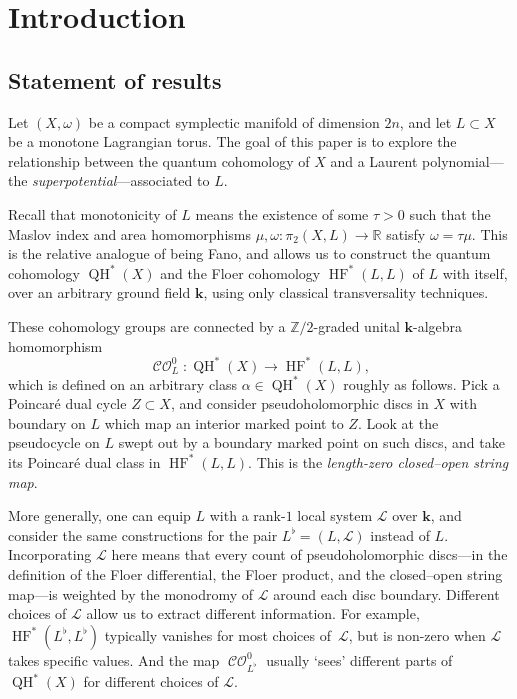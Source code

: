 \documentclass[JEP,XML,SOM,Unicode,NoEqCountersInSection,NoFloatCountersInSection,published]{cedram}
\theoremstyle{definition}
\newcommand{\RR}{\mathbb{R}}
\newcommand{\ZZ}{\mathbb{Z}}
\newcommand{\LL}{L^\flat}
\newcommand{\calL}{\mathcal{L}}
\newcommand{\kk}{{\boldsymbol{k}}}
\newcommand{\HF}{\operatorname{HF}}
\newcommand{\CO}{\operatorname{\mathcal{CO}}}
\newcommand{\QH}{\operatorname{QH}}
\begin{document}
\maketitle
\vspace*{-\baselineskip}
\tableofcontents
\mainmatter

\section{Introduction}
\label{secIntroduction}

\subsection{Statement of results}
\label{sscStatement}

Let $(X, \omega)$ be a compact symplectic manifold of dimension $2n$, and let $L \subset X$ be a monotone Lagrangian torus. The goal of this paper is to explore the relationship between the quantum cohomology of $X$ and a Laurent polynomial---the \emph{superpotential}---associated to $L$.

Recall that monotonicity of $L$ means the existence of some $\tau > 0$ such that the Maslov index and area homomorphisms $\mu, \omega : \pi_2(X, L) \to \RR$ satisfy $\omega = \tau\mu$. This is the relative analogue of being Fano, and allows us to construct the quantum cohomology $\QH^*(X)$ and the Floer cohomology $\HF^*(L, L)$ of $L$ with itself, over an arbitrary ground field $\kk$, using only classical transversality techniques.

These cohomology groups are connected by a $\ZZ/2$-graded unital $\kk$-algebra homomorphism
\[
\CO^0_L : \QH^*(X) \to \HF^*(L, L),
\]
which is defined on an arbitrary class $\alpha \in \QH^*(X)$ roughly as follows. Pick a Poincaré dual cycle $Z \subset X$, and consider pseudoholomorphic discs in $X$ with boundary on $L$ which map an interior marked point to $Z$. Look at the pseudocycle on $L$ swept out by a boundary marked point on such discs, and take its Poincaré dual class in $\HF^*(L, L)$. This is the \emph{length-zero closed--open string map}.

More generally, one can equip $L$ with a rank-$1$ local system $\calL$ over $\kk$, and consider the same constructions for the pair $\LL = (L, \calL)$ instead of $L$. Incorporating $\calL$ here means that every count of pseudoholomorphic discs---in the definition of the Floer differential, the Floer product, and the closed--open string map---is weighted by the monodromy of $\calL$ around each disc boundary. Different choices of $\calL$ allow us to extract different information. For example, $\HF^*(\LL, \LL)$ typically vanishes for most choices of~$\calL$, but is non-zero when $\calL$ takes specific values. And the map $\CO^0_{\LL}$ usually `sees' different parts of $\QH^*(X)$ for different choices of $\calL$.
\end{document}
